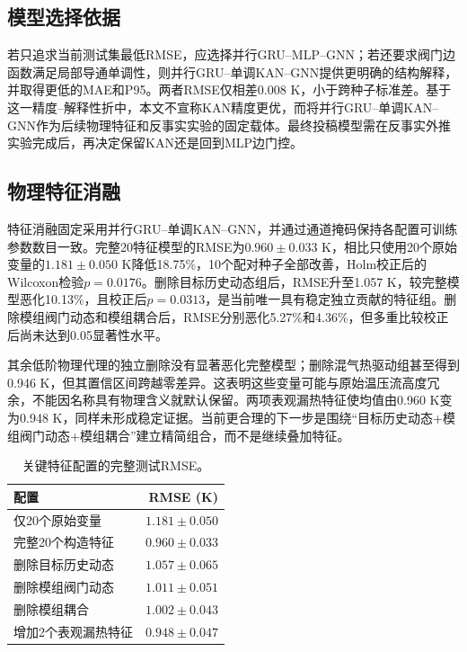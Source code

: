 \documentclass[a4paper,fleqn]{cas-dc}
\begin{document}
\subsection{模型选择依据}

若只追求当前测试集最低RMSE，应选择并行GRU--MLP--GNN；若还要求阀门边函数满足局部导通单调性，则并行GRU--单调KAN--GNN提供更明确的结构解释，并取得更低的MAE和P95。两者RMSE仅相差0.008 K，小于跨种子标准差。基于这一精度--解释性折中，本文不宣称KAN精度更优，而将并行GRU--单调KAN--GNN作为后续物理特征和反事实实验的固定载体。最终投稿模型需在反事实外推实验完成后，再决定保留KAN还是回到MLP边门控。

\subsection{物理特征消融}

特征消融固定采用并行GRU--单调KAN--GNN，并通过通道掩码保持各配置可训练参数数目一致。完整20特征模型的RMSE为$0.960\pm0.033$ K，相比只使用20个原始变量的$1.181\pm0.050$ K降低18.75\%，10个配对种子全部改善，Holm校正后的Wilcoxon检验$p=0.0176$。删除目标历史动态组后，RMSE升至1.057 K，较完整模型恶化10.13\%，且校正后$p=0.0313$，是当前唯一具有稳定独立贡献的特征组。删除模组阀门动态和模组耦合后，RMSE分别恶化5.27\%和4.36\%，但多重比较校正后尚未达到0.05显著性水平。

其余低阶物理代理的独立删除没有显著恶化完整模型；删除混气热驱动组甚至得到0.946 K，但其置信区间跨越零差异。这表明这些变量可能与原始温压流高度冗余，不能因名称具有物理含义就默认保留。两项表观漏热特征使均值由0.960 K变为0.948 K，同样未形成稳定证据。当前更合理的下一步是围绕“目标历史动态+模组阀门动态+模组耦合”建立精简组合，而不是继续叠加特征。

\begin{table}[t]
\centering
\caption{关键特征配置的完整测试RMSE。}
\label{tab:featureablation}
\begin{tabular}{@{}p{4.35cm}r@{}}
\toprule
配置 & RMSE (K) \\
\midrule
仅20个原始变量 & $1.181\pm0.050$ \\
完整20个构造特征 & $0.960\pm0.033$ \\
删除目标历史动态 & $1.057\pm0.065$ \\
删除模组阀门动态 & $1.011\pm0.051$ \\
删除模组耦合 & $1.002\pm0.043$ \\
增加2个表观漏热特征 & $0.948\pm0.047$ \\
\bottomrule
\end{tabular}
\end{table}
\end{document}
